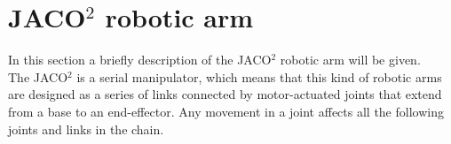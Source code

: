 \section{JACO$^2$ robotic arm}

In this section a briefly description of the JACO$^2$ robotic arm will be given. \\
The JACO$^2$  is a serial manipulator, which means that this kind of robotic arms are designed as a series of links connected by motor-actuated joints that extend from a base to an end-effector. Any movement in a joint affects all the following joints and links in the chain. 